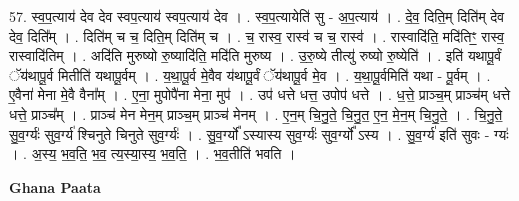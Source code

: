 \documentclass[17pt]{extarticle}
\begin{document}
57. स्व॒प॒त्याय॑ देव देव स्वप॒त्याय॑ स्वप॒त्याय॑ देव । . स्व॒प॒त्यायेति॑ सु - अ॒प॒त्याय॑ । . दे॒व॒ दिति॒म् दिति॑म् देव देव॒ दिति᳚म् । . दिति॑म् च च॒ दिति॒म् दिति॑म् च । . च॒ रास्व॒ रास्व॑ च च॒ रास्व॑ । . रास्वादि॑ति॒ मदि॑तिꣳ॒॒ रास्व॒ रास्वादि॑तिम् । . अदि॑ति मुरुष्यो रु॒ष्यादि॑ति॒ मदि॑ति मुरुष्य । . उ॒रु॒ष्ये तीत्यु॑ रुष्यो रु॒ष्येति॑ । . इति॑ यथापू॒र्वं ॅय॑थापू॒र्व मितीति॑ यथापू॒र्वम् । . य॒था॒पू॒र्व मे॒वैव य॑थापू॒र्वं ॅय॑थापू॒र्व मे॒व । . य॒था॒पू॒र्वमिति॑ यथा - पू॒र्वम् । . ए॒वैना॑ मेना मे॒वै वैना᳚म् । . ए॒ना॒ मुपोपै॑ना मेना॒ मुप॑ । . उप॑ धत्ते धत्त॒ उपोप॑ धत्ते । . ध॒त्ते॒ प्राञ्च॒म् प्राञ्च॑म् धत्ते धत्ते॒ प्राञ्च᳚म् । . प्राञ्च॑ मेन मेन॒म् प्राञ्च॒म् प्राञ्च॑ मेनम् । . ए॒न॒म् चि॒नु॒ते॒ चि॒नु॒त॒ ए॒न॒ मे॒न॒म् चि॒नु॒ते॒ । . चि॒नु॒ते॒ सु॒व॒र्ग्यः॑ सुव॒र्ग्य॑ श्चिनुते चिनुते सुव॒र्ग्यः॑ । . सु॒व॒र्ग्यो᳚ ऽस्यास्य सुव॒र्ग्यः॑ सुव॒र्ग्यो᳚ ऽस्य । . सु॒व॒र्ग्य॑ इति॑ सुवः - ग्यः॑ । . अ॒स्य॒ भ॒व॒ति॒ भ॒व॒ त्य॒स्या॒स्य॒ भ॒व॒ति॒ । . भ॒व॒तीति॑ भवति । \newline

\textbf{Ghana Paata } \newline
\end{document}
